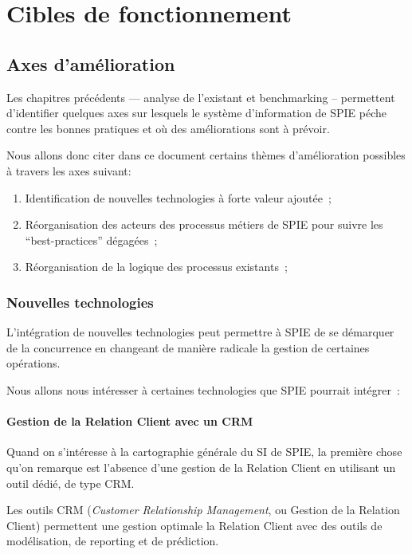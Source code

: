 \chapter{Cibles de fonctionnement}


\section{Axes d'amélioration}

    Les chapitres précédents --- analyse de l'existant et benchmarking -- permettent d'identifier quelques axes sur lesquels le système d'information de SPIE péche contre les bonnes pratiques et où des améliorations sont à prévoir.

    Nous allons donc citer dans ce document certains thèmes d'amélioration possibles à travers les axes suivant:

    \begin{enumerate}
        \item Identification de nouvelles technologies à forte valeur ajoutée~;
        \item Réorganisation des acteurs des processus métiers de SPIE pour suivre les ``best-practices'' dégagées~;
        \item Réorganisation de la logique des processus existants~;
    \end{enumerate}


    \subsection{Nouvelles technologies}

    L'intégration de nouvelles technologies peut permettre à SPIE de se démarquer de la concurrence en changeant de manière radicale la gestion de certaines opérations.

    Nous allons nous intéresser à certaines technologies que SPIE pourrait intégrer~:

        \subsubsection{Gestion de la Relation Client avec un CRM}

        Quand on s'intéresse à la cartographie générale du SI de SPIE, la première chose qu'on remarque est l'absence d'une gestion de la Relation Client en utilisant un outil dédié, de type CRM.

        Les outils CRM (\textit{Customer Relationship Management}, ou Gestion de la Relation Client) permettent une gestion optimale la Relation Client avec des outils de modélisation, de reporting et de prédiction.

